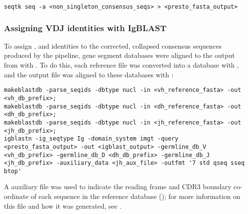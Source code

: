 {\begin{lstlisting}
seqtk seq -a <non_singleton_consensus_seqs> > <presto_fasta_output>
\end{lstlisting}

\subsubsection{Assigning VDJ identities with IgBLAST}
\label{sec:methods_comp_igpreproc_igblast}


To assign \vh, \dh and \jh identities to the corrected, collapsed consensus sequences produced by the  pipeline, gene segment databases were aligned to the  output from  with  \parencite{ye2013igblast}. To do this, each reference file was converted into a  database with , and the output  file was aligned to these databases with :

\begin{lstlisting}
makeblastdb -parse_seqids -dbtype nucl -in <vh_reference_fasta> -out <vh_db_prefix>;
makeblastdb -parse_seqids -dbtype nucl -in <dh_reference_fasta> -out <dh_db_prefix>;
makeblastdb -parse_seqids -dbtype nucl -in <jh_reference_fasta> -out <jh_db_prefix>;
igblastn -ig_seqtype Ig -domain_system imgt -query <presto_fasta_output> -out <igblast_output> -germline_db_V <vh_db_prefix> -germline_db_D <dh_db_prefix> -germline_db_J <jh_db_prefix> -auxiliary_data <jh_aux_file> -outfmt '7 std qseq sseq btop'
\end{lstlisting}

A \jh auxiliary file was used to indicate the reading frame and CDR3 boundary co-ordinate of each \jh sequence in the reference database (); for more information on this file and how it was generated, see .

}
